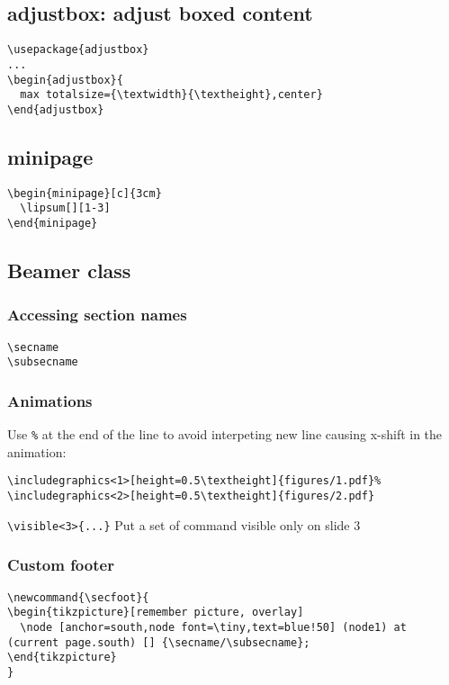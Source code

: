 \subsection{adjustbox: adjust boxed content}
\begin{verbatim}
\usepackage{adjustbox}
...
\begin{adjustbox}{
  max totalsize={\textwidth}{\textheight},center}
\end{adjustbox}
\end{verbatim}

\subsection{minipage}
\begin{minipage}[c]{3cm}
  \lipsum[][1-3]
\end{minipage}
\begin{minipage}[c]{3cm}
  \begin{verbatim}
\begin{minipage}[c]{3cm}
  \lipsum[][1-3]
\end{minipage}
  \end{verbatim}
\end{minipage}

\subsection{Beamer class}

\subsubsection{Accessing section names}
\verb |\secname|\\
\verb |\subsecname|\\

\subsubsection{Animations}
Use \verb|%| at the end of the line to avoid interpeting new line causing x-shift in the animation:
\begin{verbatim}
\includegraphics<1>[height=0.5\textheight]{figures/1.pdf}%
\includegraphics<2>[height=0.5\textheight]{figures/2.pdf}
\end{verbatim}
\verb|\visible<3>{...}| Put a set of command visible only on slide 3

\subsubsection{Custom footer}
\begin{verbatim}
\newcommand{\secfoot}{
\begin{tikzpicture}[remember picture, overlay]
  \node [anchor=south,node font=\tiny,text=blue!50] (node1) at (current page.south) [] {\secname/\subsecname};
\end{tikzpicture}
}
\end{verbatim}


